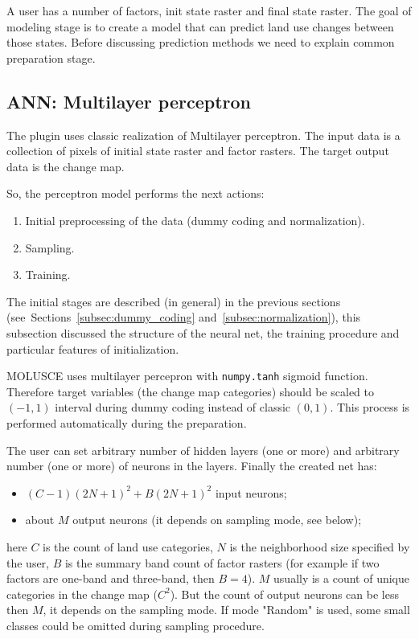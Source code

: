 \documentclass{report}
\begin{document}
A user has a number of factors, init state raster and final state raster.
The goal of modeling stage is to create a model that can predict land use changes between those states. Before discussing prediction methods we need to explain common preparation stage.

\subsection{ANN: Multilayer perceptron}\label{subsec:ANN}

The plugin uses classic realization of Multilayer perceptron. The input data is a collection of pixels of initial state raster and factor rasters. The target output data is the change map.

So, the perceptron model performs the next actions:
\begin{enumerate}
    \item Initial preprocessing of the data (dummy coding and normalization).
    \item Sampling.
    \item Training.
\end{enumerate}

The initial stages are described (in general) in the previous sections (see~Sections~\ref{subsec:dummy_coding} and~\ref{subsec:normalization}), this subsection discussed the structure of the neural net, the training procedure and particular features of initialization. 

MOLUSCE uses multilayer percepron with \verb+numpy.tanh+ sigmoid function. Therefore target variables (the change map categories) should be scaled to $(-1, 1)$ interval during dummy coding instead of classic $(0, 1)$. This process is performed automatically during the preparation.

The user can set arbitrary number of hidden layers (one or more) and arbitrary number (one or more) of neurons in the layers.
Finally the created net has:
\begin{itemize}
  \item $(C-1)(2N+1)^{2}+B(2N+1)^{2}$ input neurons;
  \item about $M$ output neurons (it depends on sampling mode, see below);
\end{itemize}
here $C$ is the count of land use categories, $N$ is the neighborhood size specified by the user, $B$ is the summary band count of factor rasters (for example if two factors are one-band and three-band, then $B=4$). $M$ usually is a count of unique categories in the change map ($C^{2}$). But the count of output neurons can be less then $M$, it depends on the sampling mode. If mode "Random" is used, some small classes could be omitted during sampling procedure. 
\end{document}

